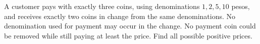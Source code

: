 A customer pays with exactly three coins, using denominations $1,2,5,10$ pesos, and receives exactly two coins in change from the same denominations. No denomination used for payment may occur in the change. No payment coin could be removed while still paying at least the price. Find all possible positive prices.
